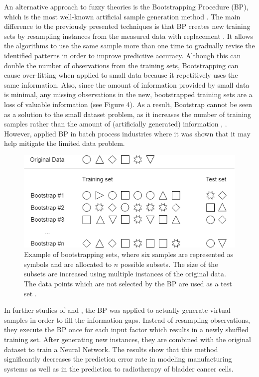 \documentclass[parskip=full]{scrartcl}
\begin{document}
An alternative approach to fuzzy theories is the Bootstrapping Procedure (BP), which is the most 
well-known artificial sample generation method \cite{AbdulLateh.2017}. The main difference to the 
previously presented techniques is that BP creates new training sets by resampling instances from the
measured data with replacement \cite{Efron.1993}. It allows the algorithms to use the same sample more 
than one time to gradually revise the identified patterns in order to improve predictive accuracy. 
Although this can double the number of observations from the training sets, Bootstrapping can cause 
over-fitting when applied to small data because it repetitively uses the same information. Also, since the 
amount of information provided by small data is minimal, any missing observations in the new, 
bootstrapped training sets are a loss of valuable information (see Figure 4). As a result, Bootstrap 
cannot be seen as a solution to the small dataset problem, as it increases the number of training 
samples rather than the amount of (artificially generated) information \cite{Tsai.2015}, \cite{Li.2018}. 
However, \cite{Ivanescu.2006} applied BP in batch process industries where it was shown that it may 
help mitigate the limited data problem.

\begin{figure}[H]
	\centering
	\includegraphics[width=0.6\linewidth]{../analysis/bootstrapping_example}
	\caption{Example of bootstrapping sets, where six samples are represented 
	as symbols and are allocated to $\mathit{n}$ possible subsets. The size of 
	the subsets are increased using multiple instances of the original data. 
	The data points which are not selected by the BP are used as a test set 
	\cite{Kuhn.2013}.}
	\label{fig:bootstrappingexample}
\end{figure}

In further studies of \cite{Tsai.2008} and \cite{Chao.2011}, the BP was applied to actually generate 
virtual samples in order to fill the information gaps. Instead of resampling observations, they execute 
the BP once for each input factor which results in a newly shuffled training set. After generating new
instances, they are combined with the original dataset to train a Neural Network. The results show that 
this method significantly decreases the prediction error rate in modeling manufacturing systems as well 
as in the prediction to radiotherapy of bladder cancer cells.
\end{document}
